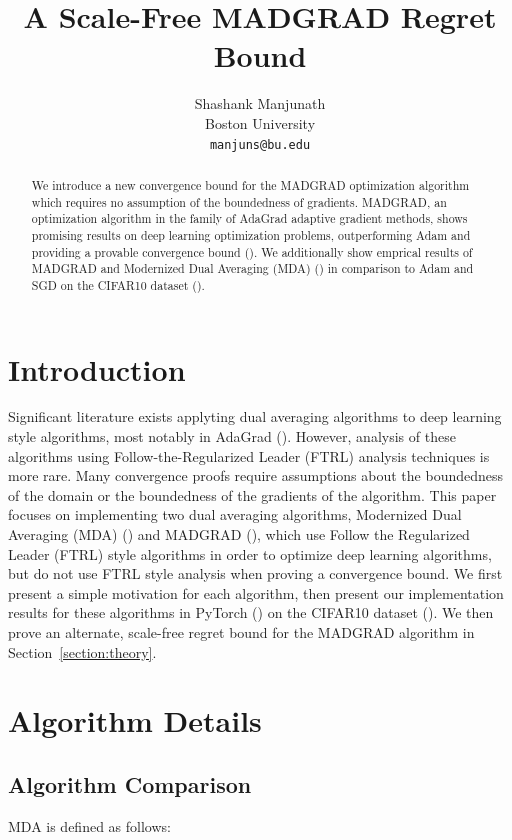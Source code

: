 \documentclass{article}
\title{A Scale-Free MADGRAD Regret Bound}
\author{
  Shashank Manjunath \\
  Boston University \\
  \texttt{manjuns@bu.edu} \\
}
\begin{document}
\maketitle

\begin{abstract}
  We introduce a new convergence bound for the MADGRAD optimization algorithm which requires no assumption of the
  boundedness of gradients. MADGRAD, an optimization algorithm in the family of AdaGrad adaptive gradient methods, shows
  promising results on deep learning optimization problems, outperforming Adam and providing a provable convergence
  bound (\cite{defazio_adaptivity_nodate}). We additionally show emprical results of MADGRAD and Modernized Dual
  Averaging (MDA) (\cite{jelassi_dual_2020}) in comparison to Adam and SGD on the CIFAR10
  dataset (\cite{krizhevsky_learning_2009}).
\end{abstract}

\section{Introduction}

Significant literature exists applyting dual averaging algorithms to deep learning style algorithms, most notably in
AdaGrad (\cite{duchi_adaptive_nodate}). However, analysis of these algorithms using Follow-the-Regularized Leader (FTRL)
analysis techniques is more rare. Many convergence proofs require assumptions about the boundedness of the domain or the
boundedness of the gradients of the algorithm. This paper focuses on implementing two dual averaging algorithms,
Modernized Dual Averaging (MDA) (\cite{jelassi_dual_2020}) and MADGRAD (\cite{defazio_adaptivity_nodate}), which use
Follow the Regularized Leader (FTRL) style algorithms in order to optimize deep learning algorithms, but do not use FTRL
style analysis when proving a convergence bound. We first present a simple motivation for each algorithm, then present
our implementation results for these algorithms in PyTorch (\cite{paszke_pytorch_2019}) on the CIFAR10 dataset
(\cite{krizhevsky_learning_2009}). We then prove an alternate, scale-free regret bound for the MADGRAD algorithm in
Section~\ref{section:theory}.

\section{Algorithm Details}

\subsection{Algorithm Comparison}
MDA is defined as follows:
\end{document}
